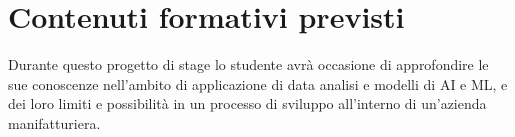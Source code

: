 \section*{Contenuti formativi previsti}
Durante questo progetto di stage lo studente avrà occasione di approfondire le sue conoscenze nell'ambito di applicazione di data analisi e modelli di AI e ML, e dei loro limiti e possibilità in un processo di sviluppo all'interno di un'azienda manifatturiera.
\newpage